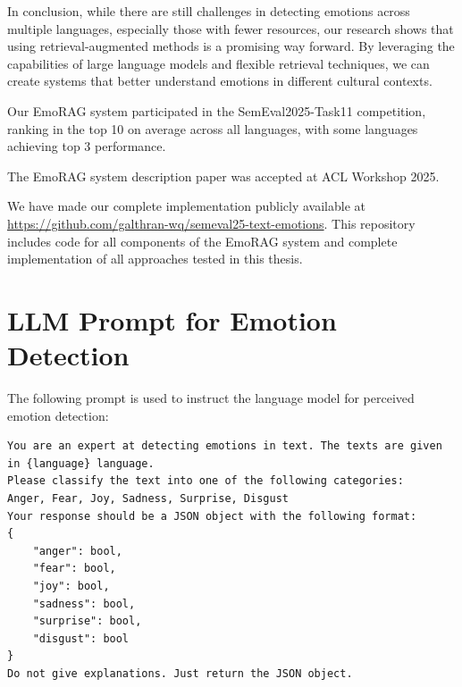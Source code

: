 \documentclass[a4paper,12pt]{extarticle}
\begin{document}
In conclusion, while there are still challenges in detecting emotions across multiple languages, especially those with fewer resources, our research shows that using retrieval-augmented methods is a promising way forward. By leveraging the capabilities of large language models and flexible retrieval techniques, we can create systems that better understand emotions in different cultural contexts.

Our EmoRAG system participated in the SemEval2025-Task11 competition, ranking in the top 10 on average across all languages, with some languages achieving top 3 performance. 

The EmoRAG system description paper was accepted at ACL Workshop 2025.

We have made our complete implementation publicly available at \url{https://github.com/galthran-wq/semeval25-text-emotions}. This repository includes code for all components of the EmoRAG system and complete implementation of all approaches tested in this thesis.

\printbibliography

\appendix

\section{LLM Prompt for Emotion Detection} 
\label{appendix:llm_prompt}


The following prompt is used to instruct the language model for perceived emotion detection:

\begin{tcolorbox}[
  colback=orange!5, 
  colframe=orange!90!black, 
  fonttitle=\bfseries, 
  title=Emotion Detection Prompt, 
  boxrule=1pt, 
  arc=4pt, 
  auto outer arc, 
  boxsep=5pt, 
  left=5pt, 
  right=5pt, 
  top=5pt, 
  bottom=5pt, 
  halign=justify,
  width=0.95\textwidth
]
\begin{lstlisting}
You are an expert at detecting emotions in text. The texts are given in {language} language.
Please classify the text into one of the following categories:
Anger, Fear, Joy, Sadness, Surprise, Disgust
Your response should be a JSON object with the following format:
{
    "anger": bool,
    "fear": bool,
    "joy": bool,
    "sadness": bool,
    "surprise": bool,
    "disgust": bool
}
Do not give explanations. Just return the JSON object.
\end{lstlisting}
\end{tcolorbox}
\end{document}
